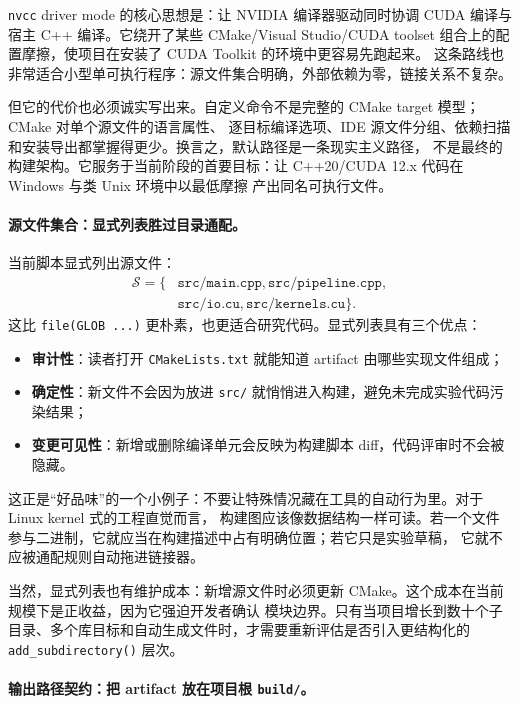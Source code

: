 \texttt{nvcc} driver mode 的核心思想是：让 NVIDIA 编译器驱动同时协调 CUDA 编译与宿主 C++ 编译。它绕开了某些
CMake/Visual Studio/CUDA toolset 组合上的配置摩擦，使项目在安装了 CUDA Toolkit 的环境中更容易先跑起来。
这条路线也非常适合小型单可执行程序：源文件集合明确，外部依赖为零，链接关系不复杂。

但它的代价也必须诚实写出来。自定义命令不是完整的 CMake target 模型；CMake 对单个源文件的语言属性、
逐目标编译选项、IDE 源文件分组、依赖扫描和安装导出都掌握得更少。换言之，默认路径是一条现实主义路径，
不是最终的构建架构。它服务于当前阶段的首要目标：让 C++20/CUDA 12.x 代码在 Windows 与类 Unix 环境中以最低摩擦
产出同名可执行文件。

\paragraph{源文件集合：显式列表胜过目录通配。}

当前脚本显式列出源文件：
\[
    \begin{aligned}
        \mathcal{S}=\{ &
        \texttt{src/main.cpp},
        \texttt{src/pipeline.cpp},           \\
                       & \texttt{src/io.cu},
        \texttt{src/kernels.cu}\}.
    \end{aligned}
\]
这比 \texttt{file(GLOB ...)} 更朴素，也更适合研究代码。显式列表具有三个优点：
\begin{itemize}
    \item \textbf{审计性}：读者打开 \texttt{CMakeLists.txt} 就能知道 artifact 由哪些实现文件组成；
    \item \textbf{确定性}：新文件不会因为放进 \texttt{src/} 就悄悄进入构建，避免未完成实验代码污染结果；
    \item \textbf{变更可见性}：新增或删除编译单元会反映为构建脚本 diff，代码评审时不会被隐藏。
\end{itemize}

这正是“好品味”的一个小例子：不要让特殊情况藏在工具的自动行为里。对于 Linux kernel 式的工程直觉而言，
构建图应该像数据结构一样可读。若一个文件参与二进制，它就应当在构建描述中占有明确位置；若它只是实验草稿，
它就不应被通配规则自动拖进链接器。

当然，显式列表也有维护成本：新增源文件时必须更新 CMake。这个成本在当前规模下是正收益，因为它强迫开发者确认
模块边界。只有当项目增长到数十个子目录、多个库目标和自动生成文件时，才需要重新评估是否引入更结构化的
\texttt{add\_subdirectory()} 层次。

\paragraph{输出路径契约：把 artifact 放在项目根 \texttt{build/}。}

